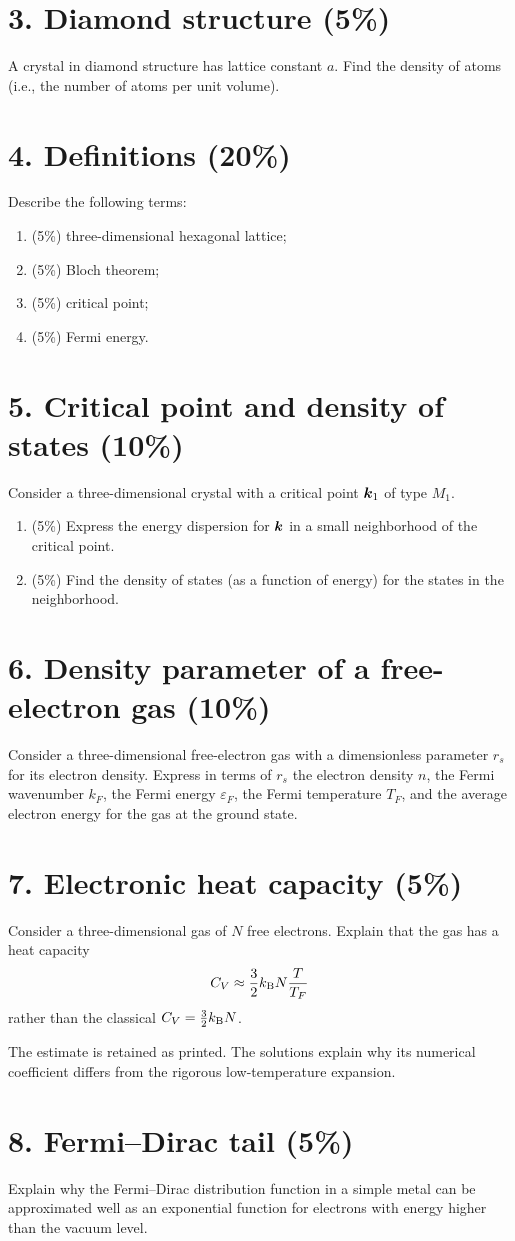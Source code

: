 \section*{3. Diamond structure (5\%)}
A crystal in diamond structure has lattice constant $a$. Find the density of atoms (i.e., the number of atoms per unit volume).

\section*{4. Definitions (20\%)}
Describe the following terms:
\begin{enumerate}[label=(\alph*)]
\item (5\%) three-dimensional hexagonal lattice;
\item (5\%) Bloch theorem;
\item (5\%) critical point;
\item (5\%) Fermi energy.
\end{enumerate}

\section*{5. Critical point and density of states (10\%)}
Consider a three-dimensional crystal with a critical point $\boldsymbol{k}_1$ of type $M_1$.
\begin{enumerate}[label=(\alph*)]
\item (5\%) Express the energy dispersion for $\boldsymbol{k}$ in a small neighborhood of the critical point.
\item (5\%) Find the density of states (as a function of energy) for the states in the neighborhood.
\end{enumerate}

\section*{6. Density parameter of a free-electron gas (10\%)}
Consider a three-dimensional free-electron gas with a dimensionless parameter $r_s$ for its electron density. Express in terms of $r_s$ the electron density $n$, the Fermi wavenumber $k_F$, the Fermi energy $\varepsilon_F$, the Fermi temperature $T_F$, and the average electron energy for the gas at the ground state.

\section*{7. Electronic heat capacity (5\%)}
Consider a three-dimensional gas of $N$ free electrons. Explain that the gas has a heat capacity
\[
C_V\approx\frac32k_{\mathrm B} N\frac{T}{T_F}
\]
rather than the classical $C_V=\frac32k_{\mathrm B} N$.
\begin{sourceNote}
The estimate is retained as printed. The solutions explain why its numerical coefficient differs from the rigorous low-temperature expansion.
\end{sourceNote}

\section*{8. Fermi--Dirac tail (5\%)}
Explain why the Fermi--Dirac distribution function in a simple metal can be approximated well as an exponential function for electrons with energy higher than the vacuum level.
\endgroup

